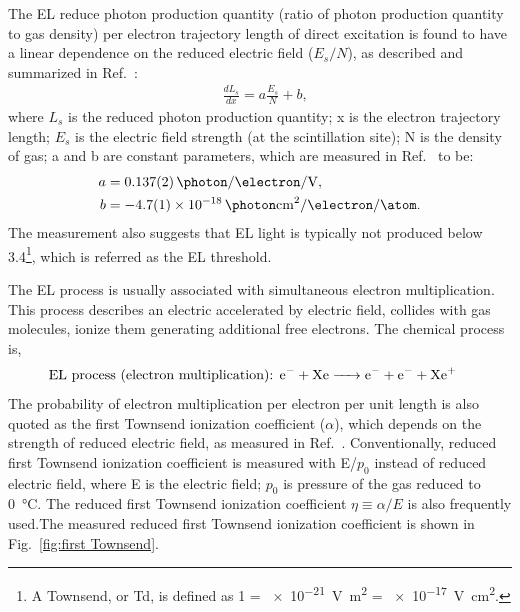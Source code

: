 The EL reduce photon production quantity (ratio of photon production quantity to gas density) per electron trajectory length of direct excitation is found to have a linear dependence on the reduced electric field ($E_s/N$), as described and summarized in Ref.~\cite{Santos1994, Fonseca2004, Monteiro2007, Chepel2013a}:
\begin{align}
&\frac{dL_s}{dx}=a \frac{E_s}{N} + b ,
\end{align} 
where $L_s$ is the reduced photon production quantity; x is the electron trajectory length; $E_s$ is the electric field strength (at the scintillation site); N is the density of gas; a and b are constant parameters,  which are measured in Ref.~\cite{ Fonseca2004, Chepel2013a} to be:  
\begin{align}
a &= \SI[separate-uncertainty=false]{0.137(2)}{\photon\per\electron\per\V} , \\
b &= \SI[separate-uncertainty=false]{-4.7(1) e-18 }{\photon\cm\squared\per\electron\per\atom}. 
\end{align}
The measurement also suggests that EL light is typically not produced below \SI{3.4}{\townsend}\footnote{A Townsend, or Td, is defined as \SI{1}{\townsend} = \SI{e-21} {\V\m\squared} = \SI{e-17}{\V\cm\squared}.}, which is referred as the EL threshold.

The EL process is usually associated with simultaneous electron multiplication. This process describes an electric accelerated by electric field, collides with gas molecules, ionize them generating additional free electrons. The chemical process is, 
\begin{align}
\text{EL process (electron multiplication): }&\ce{e^- + Xe -> e^- + e^-  +Xe^{+}}
\end{align}
The probability of electron multiplication per electron per unit length is also quoted as the first Townsend ionization coefficient ($\alpha$), which depends on the strength of reduced electric field, as measured in Ref.~\cite{Kruithof1940, Derenzo1974}. Conventionally, reduced first Townsend ionization coefficient is measured with E/$p_0$ instead of reduced electric field, where E is the electric field; $p_0$ is pressure of the gas reduced to \SI{0}{\celsius}. The reduced first Townsend ionization coefficient $\eta \equiv \alpha / E$ is also frequently used.The measured reduced first Townsend ionization coefficient is shown in Fig.~\ref{fig:first Townsend}.

